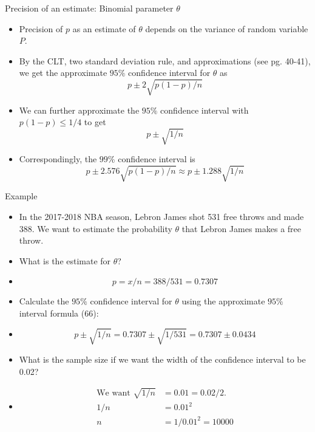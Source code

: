 \documentclass[10pt, handout, xcolor=table]{beamer}
\begin{document}
\begin{frame}{Precision of an estimate: Binomial parameter $\theta$}
\begin{itemize}\itemsep3ex
\item<1-> Precision of $p$ as an estimate of $\theta$ depends on the variance of random variable $P$.
\item<2-> By the CLT, two standard deviation rule, and approximations (see pg. 40-41), we get the approximate {\color{blue} $95\%$ confidence interval} for $\theta$ as
\[
p \pm 2\sqrt{p(1-p)/n}
\]
\item<3-> We can further approximate the $95\%$ confidence interval with $p(1-p) \leq 1/4$ to get
\begin{equation}
p \pm \sqrt{1/n} \tag{66}
\end{equation}
\item<4-> Correspondingly, the $99\%$ confidence interval is
\[
p \pm 2.576\sqrt{p(1-p)/n} \approx p \pm 1.288\sqrt{1/n}
\]
\end{itemize}
\end{frame}

\begin{frame}{Example}
\begin{itemize}
\setlength{\itemsep}{10pt}
\item<1->[] In the 2017-2018 NBA season, Lebron James shot 531 free throws and made 388. We want to estimate the probability $\theta$ that Lebron James makes a free throw. 
\item<2->[Q1:] What is the estimate for $\theta$?
\item<3->[] {\color{red}
\vspace*{-0.5cm}
\[
p = x/n = 388/531 = 0.7307
\]
}
\vspace*{-0.5cm}
\item<4->[Q2:] Calculate the $95\%$ confidence interval for $\theta$ using the approximate $95\%$ interval formula (66):
\item<5->[] {\color{red}
\vspace*{-0.5cm}
\[
p \pm \sqrt{1/n} = 0.7307 \pm \sqrt{1/531} = 0.7307 \pm 0.0434
\]
}
\vspace*{-0.5cm}
\item<6->[Q3:] What is the sample size if we want the width of the confidence interval to be 0.02?
\item<7->[] {\color{red}
\vspace*{-0.5cm}
\begin{align*}
\text{We want } \sqrt{1/n} &= 0.01 = 0.02/2.\\
1/n &= 0.01^2\\
n &= 1/0.01^2 = 10000
\end{align*}
}
\vspace*{-0.5cm}
\end{itemize}
\end{frame}
\end{document}
